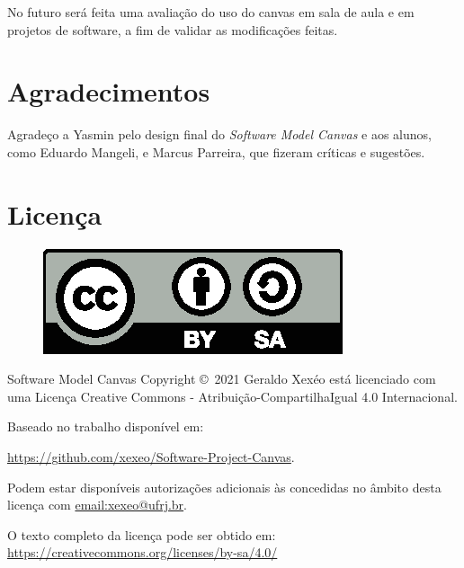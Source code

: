 \documentclass[a4]{report}
\begin{document}
No futuro será feita uma avaliação do uso do canvas em sala de aula e em projetos de software, a fim de validar as modificações feitas.



\section*{Agradecimentos}

Agradeço a Yasmin pelo design final do \textit{Software Model Canvas} e aos alunos, como Eduardo Mangeli, e Marcus Parreira, que fizeram críticas e sugestões.

\newpage

\section*{Licença}

\begin{figure}[h]
    \centering
    \includegraphics{imagens/by-sa}
    \label{fig:by-sa}
\end{figure}


Software Model Canvas Copyright \copyright\  2021 Geraldo Xexéo está licenciado com uma Licença Creative Commons - Atribuição-CompartilhaIgual 4.0 Internacional.

Baseado no trabalho disponível em:

\url{https://github.com/xexeo/Software-Project-Canvas}.

Podem estar disponíveis autorizações adicionais às concedidas no âmbito desta licença com \url{email:xexeo@ufrj.br}.

O texto completo da licença pode ser obtido em:
\url{https://creativecommons.org/licenses/by-sa/4.0/}

\printbibliography
\end{document}
